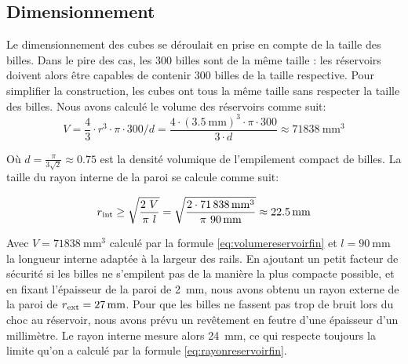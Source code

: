 \subsection{Dimensionnement}
Le dimensionnement des cubes se déroulait en prise en compte de la taille des billes. Dans le pire des cas, les \num{300} billes sont de la même taille : les réservoirs doivent alors être capables de contenir \num{300} billes de la taille respective. Pour simplifier la construction, les cubes ont tous la même taille sans respecter la taille des billes.
Nous avons calculé le volume des réservoirs comme suit:
\begin{equation}
    V = \frac{4}{3} \cdot r^3 \cdot \pi \cdot \num{300} / d = \frac{4 \cdot (\SI{3.5}{\mm})^3 \cdot \pi \cdot \num{300}}{3 \cdot d} \approx \SI{71838}{\mm\cubed}
    \label{eq:volumereservoirfin}
\end{equation}

Où \(d = \frac{\pi}{3\sqrt{2}} \approx \num{0.75}\) est la densité volumique de l'empilement compact de billes.
La taille du rayon interne de la paroi se calcule comme suit:

\begin{equation}r\textsubscript{int} \geq \sqrt{\frac{2\ V}{\pi\ l}}=\sqrt{\frac{2 \cdot \SI{71838}{\mm\cubed}}{\pi\ \SI{90}{\mm}}} \approx \SI{22.5}{\mm} \label{eq:rayonreservoirfin}\end{equation}

Avec $V= \SI{71838}{\mm\cubed}$ calculé par la formule \ref{eq:volumereservoirfin} et $l=\SI{90}{\mm}$ la longueur interne adaptée à la largeur des rails. En ajoutant un petit facteur de sécurité si les billes ne s'empilent pas de la manière la plus compacte possible, et en fixant l'épaisseur de la paroi de \SI{2}{\mm}, nous avons obtenu un rayon externe de la paroi de $r\textsubscript{ext}=\SI{27}{\mm}$. Pour que les billes ne fassent pas trop de bruit lors du choc au réservoir, nous avons prévu un revêtement en feutre d'une épaisseur d'un millimètre. Le rayon interne mesure alors \SI{24}{\mm}, ce qui respecte toujours la limite qu'on a calculé par la formule \ref{eq:rayonreservoirfin}.